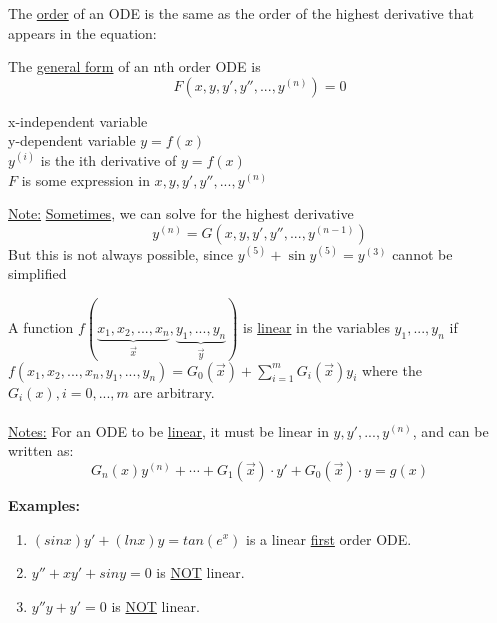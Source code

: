\begin{definition-N}
	The \underline{order} of an ODE is the same as the order of the highest derivative that appears in the equation:
\end{definition-N}

\begin{definition-N}
	The \underline{general form} of an nth order ODE is 
	\begin{equation*}
		\boxed{F(x, y, y', y'', ..., y^{(n)}) = 0}
	\end{equation*}
	\begin{center}
		x-independent variable\\
	y-dependent variable $y = f(x)$\\
	$y^{(i)}$ is the ith derivative of $y = f(x)$\\
	$F$ is some expression in $x, y, y', y'', ..., y^{(n)}$\\
	\end{center}	
	\underline{Note:} \underline{Sometimes}, we can solve for the highest derivative
	\begin{equation*}
		\boxed{y^{(n)} = G(x, y, y', y'', ..., y^{(n-1)})}
	\end{equation*}
	But this is not always possible, since $y^{(5)} + \sin y^{(5)} = y^{(3)}$ cannot be simplified
\end{definition-N} 
\redhline
\begin{definition-N}
	A function $f(\underbrace{x_1, x_2, ..., x_n}_{\vec{x}}, \underbrace{y_1, ..., y_n}_{\vec{y}})$ is \underline{linear} in the variables $y_1, ..., y_n$ if \\$f(x_1, x_2, ..., x_n, y_1, ..., y_n) = G_0(\vec{x}) + \sum_{i = 1}^m G_i(\vec{x})y_i$ where the $G_i(x), i=0,...,m$ are arbitrary.\\\\
	\underline{Notes:}  For an ODE to be \underline{linear}, it must be linear in $y, y', ... , y^{(n)}$, and can be written as:
	\begin{equation*}
		\boxed{G_n(x) y^{(n)} + \cdots + G_1 (\vec{x})\cdot y' + G_0(\vec{x})\cdot y = g(x)}
	\end{equation*}
\end{definition-N}

\textbf{Examples:}
	\begin{enumerate}[label=\protect\circled{\arabic*}]
		\item $(sinx)y' + (lnx)y = tan (e^x)$ is a linear \underline{first} order ODE.
		\item $y'' + xy' + siny = 0$ is \underline{NOT} linear.
		\item $y''y + y' = 0$ is \underline{NOT} linear.
	\end{enumerate}
\redhline

